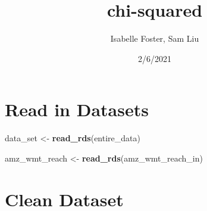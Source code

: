 \documentclass[
]{article}
\title{chi-squared}
\author{Isabelle Foster, Sam Liu}
\date{2/6/2021}
\newenvironment{Shaded}{\begin{snugshade}}{\end{snugshade}}
\newcommand{\KeywordTok}[1]{\textcolor[rgb]{0.13,0.29,0.53}{\textbf{#1}}}
\newcommand{\NormalTok}[1]{#1}
\newcommand{\StringTok}[1]{\textcolor[rgb]{0.31,0.60,0.02}{#1}}
\begin{document}
\maketitle

\hypertarget{read-in-datasets}{%
\section{Read in Datasets}\label{read-in-datasets}}

\begin{Shaded}
\begin{Highlighting}[]
\NormalTok{data\_set \textless{}{-}}\StringTok{ }
\StringTok{  }\KeywordTok{read\_rds}\NormalTok{(entire\_data)}

\NormalTok{amz\_wmt\_reach \textless{}{-}}
\StringTok{  }\KeywordTok{read\_rds}\NormalTok{(amz\_wmt\_reach\_in)}
\end{Highlighting}
\end{Shaded}

\hypertarget{clean-dataset}{%
\section{Clean Dataset}\label{clean-dataset}}
\end{document}
